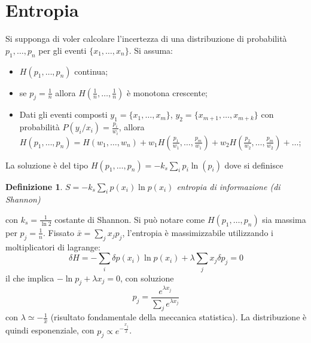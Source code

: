\documentclass[12pt, a4paper]{book}
\theoremstyle{theorem}
\newtheorem{definition}{Definizione}[section]
\begin{document}
		\section{Entropia}
			Si supponga di voler calcolare l'incertezza di una distribuzione di probabilità $p_{1},\ldots,p_{n}$ per gli eventi $\{x_{1},\ldots,x_{n}\}$.
			Si assuma:
			\begin{itemize}
				\item $H(p_{1},\ldots,p_{n})$ continua;
				\item se $p_{j}=\frac{1}{n}$ allora $H(\frac{1}{n},\ldots,\frac{1}{n})$ è monotona crescente;
				\item Dati gli eventi composti $y_{1}=\{x_{1},\ldots,x_{m}\}$, $y_{2}=\{x_{m+1},\ldots,x_{m+k}\}$ con probabilità $P(y_{i}/x_{i})=\frac{p_{i}}{w_{i}}$, allora 
					\\$H(p_{1},\ldots,p_{n})=H(w_{1},\ldots,w_{n})+w_{1}H\left(\frac{p_{1}}{w_{1}},\ldots,\frac{p_{m}}{w_{1}}\right)+w_{2}H\left(\frac{p_{2}}{w_{2}},\ldots,\frac{p_{m}}{w_{2}}\right)+\ldots$;
			\end{itemize}
			La soluzione è del tipo $H(p_{1},\ldots,p_{n})=-k_{s}\sum_{i}p_{i}\ln(p_{i})$ dove si definisce
			\begin{definition}
				$S=-k_{s}\sum_{i}p(x_i)\ln p(x_i)$ entropia di informazione (di Shannon)
				\label{equation:entropia}
			\end{definition}
			con $k_{s}=\frac{1}{\ln2}$ costante di Shannon.
			Si può notare come $H(p_{1},\ldots,p_{n})$ sia massima per $p_{j}=\frac{1}{n}$.
			Fissato $\bar{x}=\sum_{j}x_{j}p_{j}$, l'entropia è massimizzabile utilizzando i moltiplicatori di lagrange:
			\begin{equation*}
				\delta H=-\sum_{i}\delta p(x_i)\ln p(x_i)+\lambda\sum_{j}x_{j}\delta p_{j}=0
			\end{equation*}
			il che implica $-\ln p_{j}+\lambda x_{j}=0$, con soluzione
			\begin{equation}
				p_{j}=\frac{e^{\lambda x_{j}}}{\sum_{j}e^{\lambda x_{j}}}
			\end{equation}
			con $\lambda\simeq -\frac{1}{\bar{x}}$ (risultato fondamentale della meccanica statistica).
			La distribuzione è quindi esponenziale, con $p_{j}\propto e^{-\frac{x_{j}}{\bar{x}}}$.
		
\end{document}
